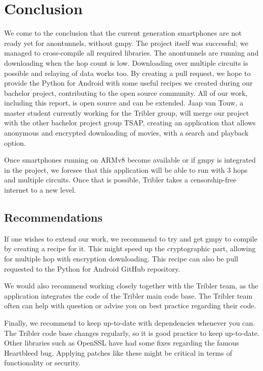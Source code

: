 \chapter{Conclusion}
\label{cpt:conclusion}
	We come to the conclusion that the current generation smartphones are not ready yet for anontunnels, without gmpy. The project itself was successful; we managed to cross-compile all required libraries. The anontunnels are running and downloading when the hop count is low. Downloading over multiple circuits is possible and relaying of data works too. By creating a pull request, we hope to provide the Python for Android with some useful recipes we created during our bachelor project, contributing to the open source community. 
	All of our work, including this report, is open source and can be extended. Jaap van Touw, a master student currently working for the Tribler group, will merge our project with the other bachelor project group TSAP, creating an application that allows anonymous and encrypted downloading of movies, with a search and playback option.
	
	
	Once smartphones running on ARMv8 become available or if gmpy is integrated in the project, we foresee that this application will be able to run with 3 hops and multiple circuits. Once that is possible, Tribler takes a censorship-free internet to a new level.
	
	\section{Recommendations}
		If one wishes to extend our work, we recommend to try and get gmpy to compile by creating a recipe for it. This might speed up the cryptographic part, allowing for multiple hop with encryption downloading. This recipe can also be pull requested to the Python for Android GitHub repository.
		
		We would also recommend working closely together with the Tribler team, as the application integrates the code of the Tribler main code base. The Tribler team often can help with question or advise you on best practice regarding their code.
		
		Finally, we recommend to keep up-to-date with dependencies whenever you can. The Tribler code base changes regularly, so it is good practice to keep up-to-date. Other libraries such as OpenSSL have had some fixes regarding the famous Heartbleed bug. Applying patches like these might be critical in terms of functionality or security.
		
